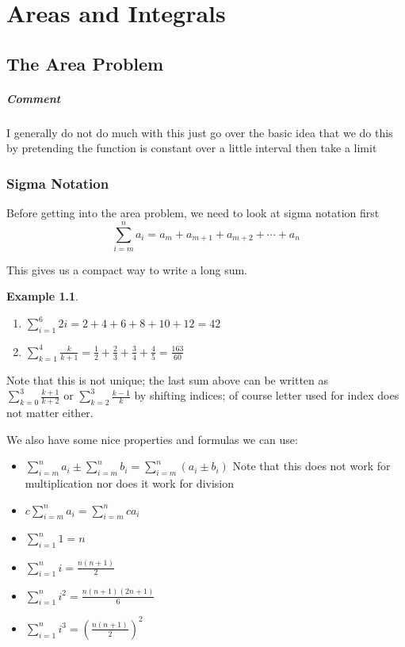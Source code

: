 \documentclass[letterpaper, 11pt, openany]{book}
\theoremstyle{mytheoremstyle}
\theoremstyle{myexamplestyle}
\newtheorem{example}{Example}[section]
\newenvironment{commentary}{\paragraph{\sffamily \smaller \fontseries{b}\selectfont Comment}}{}
\begin{document}
\chapter{Areas and Integrals}
\section{The Area Problem}
\begin{commentary}
    I generally do not do much with this just go over the basic idea that we do this by pretending the function is constant over a little interval then take a limit
\end{commentary}
\subsection{Sigma Notation}
Before getting into the area problem, we need to look at sigma notation first
\[\sum_{i=m}^{n} a_{i} = a_{m} + a_{m+1} + a_{m+2} + \cdots + a_{n}\]

This gives us a compact way to write a long sum.

\begin{example}\label{e:sigma-basic}
    \begin{enumerate}
        \item \(\displaystyle \sum_{i=1}^{6} 2i = 2 + 4 + 6 + 8 + 10 + 12 = 42\)
        \item \(\displaystyle \sum_{k=1}^{4} \frac{k}{k + 1} = \frac{1}{2} + \frac{2}{3} + \frac{3}{4} + \frac{4}{5} = \frac{163}{60}\)
    \end{enumerate}
\end{example}
Note that this is not unique; the last sum above can be written as \(\displaystyle \sum_{k=0}^{3} \frac{k + 1}{k + 2} \text{ or } \sum_{k=2}^{3} \frac{k - 1}{k}\) by shifting indices; of course letter used for index does not matter either.

We also have some nice properties and formulas we can use:

\begin{itemize}
    \item \(\displaystyle \sum_{i=m}^{n} a_i \pm \sum_{i=m}^{n} b_i = \sum_{i=m}^{n} (a_i \pm b_i)\) Note that this does not work for multiplication nor does it work for division
    \item \(\displaystyle c \sum_{i=m}^{n} a_i = \sum_{i=m}^{n} c a_i\)
    \item \(\displaystyle \sum_{i=1}^{n} 1 = n\)
    \item \(\displaystyle \sum_{i=1}^{n} i = \frac{n(n+1)}{2}\)
    \item \(\displaystyle \sum_{i=1}^{n} i^2 = \frac{n(n+1)(2n+1)}{6}\)
    \item \(\displaystyle \sum_{i=1}^{n} i^3 = \left(\frac{n(n+1)}{2}\right)^2\)
    
\end{itemize}
\end{document}
